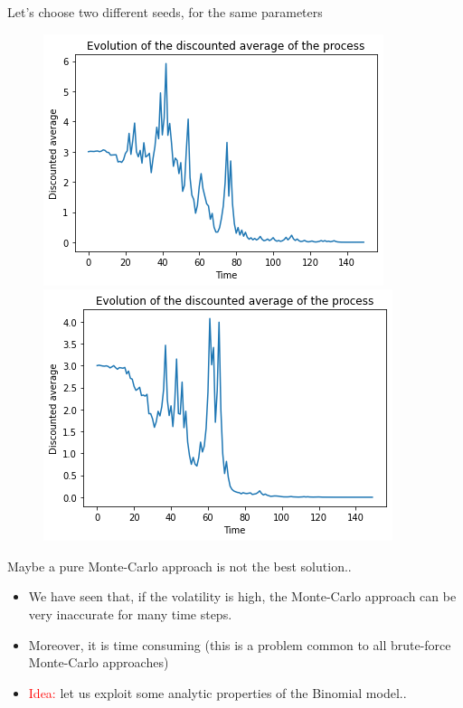 \documentclass[9 pt]{beamer} %
\def \red {\textcolor{red}}
\begin{document}
\begin{frame}{Let's choose two different seeds, for the same parameters}
 \begin{figure}
\centering
\begin{minipage}[b]{.5\textwidth}
  \centering
 \includegraphics[scale=0.4]{avseed1.png}
\end{minipage}%
\begin{minipage}[b]{.5\textwidth}
  \centering
 \includegraphics[scale=0.4]{avseed2.png}
\end{minipage}
\end{figure}
\end{frame}

\begin{frame}{Maybe a pure Monte-Carlo approach is not the best solution..}
\begin{itemize}
\item We have seen that, if the volatility is high, the Monte-Carlo approach can be very inaccurate for many time steps.
\item Moreover, it is time consuming (this is a problem common to all brute-force Monte-Carlo approaches) 
\item  \red{Idea:} let us exploit some analytic properties of the Binomial model..
\end{itemize}
\end{frame}
\end{document}
